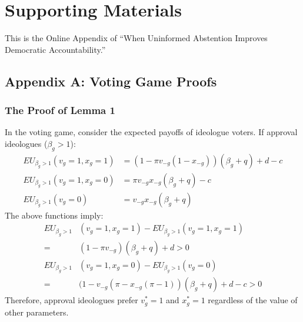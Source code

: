 
\clearpage
\appendix
\pagestyle{plain}
\setcounter{page}{1}

\section{Supporting Materials } %

\par This is the Online Appendix of ``When Uninformed Abstention Improves Democratic Accountability.''

\subsection{Appendix A: Voting Game Proofs}

\subsubsection{The Proof of Lemma 1}

\par In the voting game, consider the expected payoffs of ideologue voters. 
If approval ideologues ($\beta_g > 1$):
\begin{align*}
EU_{\beta_g > 1 }(v_g=1, x_g=1) &= (1-\pi v_{-g} (1- x_{-g}))(\beta_g + q) + d - c \\
EU_{\beta_g > 1 }(v_g=1, x_g=0) &= \pi v_{-g} x_{-g} (\beta_g + q) - c \\
EU_{\beta_g > 1 }(v_g=0) &= v_{-g} x_{-g} (\beta_g + q)
\end{align*} 
\noindent The above functions imply: 
\begin{align*}
EU_{\beta_g > 1}&(v_g=1, x_g=1) - EU_{\beta_g > 1 }(v_g=1, x_g=1) \\
=& (1- \pi v_{-g})(\beta_g + q) + d > 0 \\
EU_{\beta_g > 1}&(v_g=1, x_g=0) - EU_{\beta_g > 1 }(v_g=0)  \\
=& (1-v_{-g} (\pi - x_{-g}(\pi - 1))(\beta_g + q) + d -c > 0 
\end{align*}
\noindent Therefore, approval ideologues prefer $v^*_g=1$ and $x^*_g=1$ regardless of the value of other parameters.

